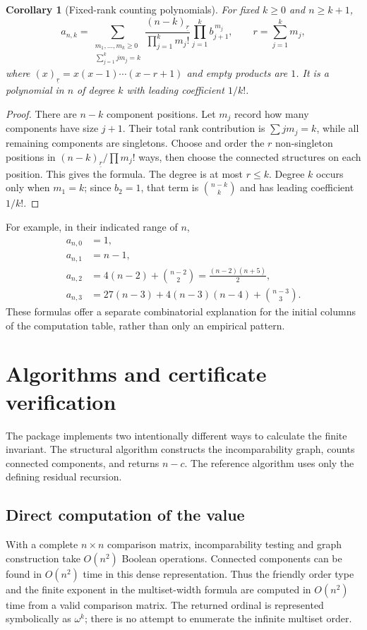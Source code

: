\documentclass[11pt,letterpaper]{article}
\newtheorem{corollary}[corollary]{Corollary}
\theoremstyle{definition}
\theoremstyle{remark}
\begin{document}
\begin{corollary}[Fixed-rank counting polynomials]\label{cor:polynomial}
For fixed $k\geq0$ and $n\geq k+1$,
\begin{equation}\label{eq:fixed-rank}
 a_{n,k}=
 \sum_{\substack{m_1,\ldots,m_k\geq0\\\sum_{j=1}^k j m_j=k}}
 \frac{(n-k)_{\underline r}}{\prod_{j=1}^k m_j!}
 \prod_{j=1}^k b_{j+1}^{\,m_j},
 \qquad r=\sum_{j=1}^k m_j,
\end{equation}
where $(x)_{\underline r}=x(x-1)\cdots(x-r+1)$ and empty products are $1$.
It is a polynomial in $n$ of degree $k$ with leading coefficient $1/k!$.
\end{corollary}
\begin{proof}
There are $n-k$ component positions. Let $m_j$ record how many components
have size $j+1$. Their total rank contribution is $\sum jm_j=k$, while
all remaining components are singletons. Choose and order the $r$ non-singleton
positions in $(n-k)_{\underline r}/\prod m_j!$ ways, then choose the connected
structures on each position. This gives the formula.
The degree is at most $r\leq k$. Degree $k$ occurs only when $m_1=k$;
since $b_2=1$, that term is $\binom{n-k}{k}$ and has leading coefficient $1/k!$.
\end{proof}

For example, in their indicated range of $n$,
\begin{align*}
 a_{n,0}&=1,\\
 a_{n,1}&=n-1,\\
 a_{n,2}&=4(n-2)+\binom{n-2}{2}
          =\frac{(n-2)(n+5)}2,\\
 a_{n,3}&=27(n-3)+4(n-3)(n-4)+\binom{n-3}{3}.
\end{align*}
These formulas offer a separate combinatorial explanation for the initial
columns of the computation table, rather than only an empirical pattern.

\section{Algorithms and certificate verification}
\label{sec:algorithms}
The package implements two intentionally different ways to calculate the
finite invariant. The structural algorithm constructs the incomparability
graph, counts connected components, and returns $n-c$. The reference
algorithm uses only the defining residual recursion.

\subsection{Direct computation of the value}
With a complete $n\times n$ comparison matrix, incomparability testing and
graph construction take $O(n^2)$ Boolean operations. Connected components
can be found in $O(n^2)$ time in this dense representation. Thus the friendly
order type and the finite exponent in the multiset-width formula are
computed in $O(n^2)$ time from a valid comparison matrix. The returned
ordinal is represented symbolically as $\omega^k$; there is no attempt to
enumerate the infinite multiset order.
\end{document}
